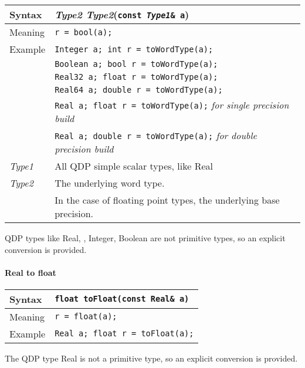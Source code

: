 \documentclass[12pt,letterpaper]{article}
\newcommand{\tReal}{Real}
\newcommand{\tInt}{Integer}
\newcommand{\tBoolean}{Boolean}
\begin{document}
\begin{flushleft}
  \begin{tabular}{|l|l|}
  \hline
  Syntax      & {\it Type2 Type2}({\tt const {\it Type1}\& a})\\
  \hline
  Meaning     & \verb|r = bool(a);|\\
  \hline
  Example     & {\tt \tInt{} a; int r = toWordType(a);} \\
              & {\tt \tBoolean{} a; bool r = toWordType(a);} \\
              & {\tt \tReal32{} a; float r = toWordType(a);} \\
              & {\tt \tReal64{} a; double r = toWordType(a);} \\
              & {\tt \tReal{} a; float r = toWordType(a);} {\em for single precision build} \\
              & {\tt \tReal{} a; double r = toWordType(a);} {\em for double precision build} \\
  \hline
  {\it Type1} & All QDP simple scalar types, like \tReal \\
  {\it Type2} & The underlying word type.  \\
              & In the case of floating point types, the underlying base precision. \\
  \hline
  \end{tabular}
\end{flushleft}

QDP types like \tReal{}, \tDouble{}, \tInt, \tBoolean{} are not primitive types, 
so an explicit conversion is provided.

\paragraph{Real to float} 

\begin{flushleft}
  \begin{tabular}{|l|l|}
  \hline
  Syntax      & {\tt float toFloat(const \tReal\& a)} \\
  \hline
  Meaning     & \verb|r = float(a);|\\
  \hline
  Example     & {\tt \tReal{} a; float r = toFloat(a);} \\
  \hline
  \end{tabular}
\end{flushleft}

The QDP type \tReal{} is not a primitive type, so an explicit conversion is provided.
\end{document}
